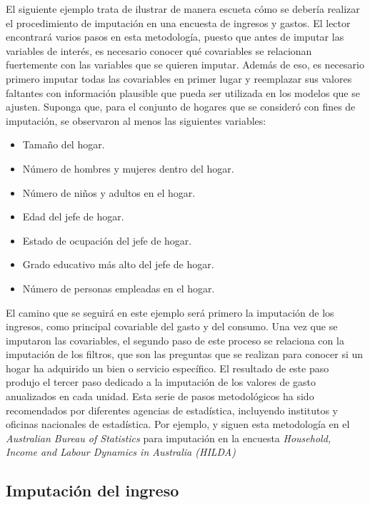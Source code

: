 \documentclass[
  12pt,
]{book}
\providecommand{\tightlist}{%
  \setlength{\itemsep}{0pt}\setlength{\parskip}{0pt}}
\begin{document}
El siguiente ejemplo trata de ilustrar de manera escueta cómo se debería realizar el procedimiento de imputación en una encuesta de ingresos y gastos. El lector encontrará varios pasos en esta metodología, puesto que antes de imputar las variables de interés, es necesario conocer qué covariables se relacionan fuertemente con las variables que se quieren imputar. Además de eso, es necesario primero imputar todas las covariables en primer lugar y reemplazar sus valores faltantes con información plausible que pueda ser utilizada en los modelos que se ajusten. Suponga que, para el conjunto de hogares que se consideró con fines de imputación, se observaron al menos las siguientes variables:

\begin{itemize}
\tightlist
\item
  Tamaño del hogar.
\item
  Número de hombres y mujeres dentro del hogar.
\item
  Número de niños y adultos en el hogar.
\item
  Edad del jefe de hogar.
\item
  Estado de ocupación del jefe de hogar.
\item
  Grado educativo más alto del jefe de hogar.
\item
  Número de personas empleadas en el hogar.
\end{itemize}

El camino que se seguirá en este ejemplo será primero la imputación de los ingresos, como principal covariable del gasto y del consumo. Una vez que se imputaron las covariables, el segundo paso de este proceso se relaciona con la imputación de los filtros, que son las preguntas que se realizan para conocer si un hogar ha adquirido un bien o servicio específico. El resultado de este paso produjo el tercer paso dedicado a la imputación de los valores de gasto anualizados en cada unidad. Esta serie de pasos metodológicos ha sido recomendados por diferentes agencias de estadística, incluyendo institutos y oficinas nacionales de estadística. Por ejemplo, \citet{Hayes_Watson_2009} y \citet{Sun_2010} siguen esta metodología en el \emph{Australian Bureau of Statistics} para imputación en la encuesta \emph{Household, Income and Labour Dynamics in Australia (HILDA)}

\hypertarget{imputaciuxf3n-del-ingreso}{%
\subsection{Imputación del ingreso}\label{imputaciuxf3n-del-ingreso}}
\end{document}
